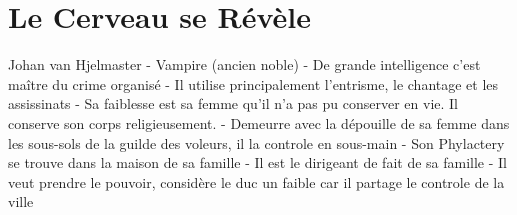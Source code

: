\section{Le Cerveau se Révèle}

Johan van Hjelmaster
 - Vampire (ancien noble)
 - De grande intelligence c'est maître du crime organisé
 - Il utilise principalement l'entrisme, le chantage et les assissinats
 - Sa faiblesse est sa femme qu'il n'a pas pu conserver en vie. Il conserve son corps religieusement.
 - Demeurre avec la dépouille de sa femme dans les sous-sols de la guilde des voleurs, il la controle 
   en sous-main
 - Son Phylactery se trouve dans la maison de sa famille
 - Il est le dirigeant de fait de sa famille
 - Il veut prendre le pouvoir, considère le duc un faible car il partage le controle de la ville


